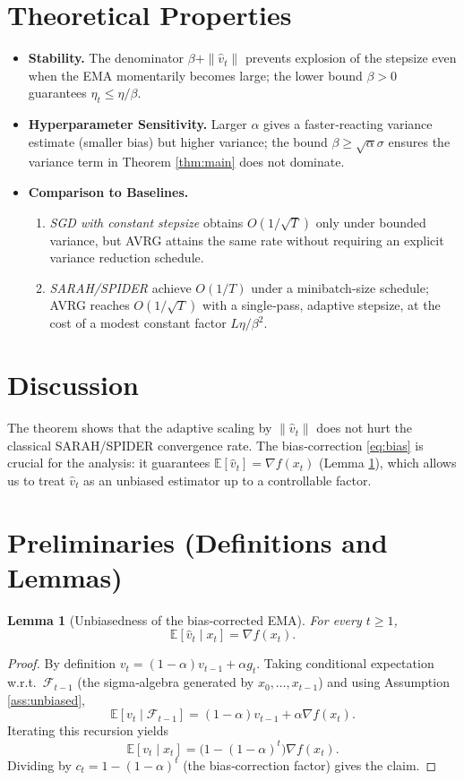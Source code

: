 \documentclass[11pt]{article}
\newtheorem{lemma}{Lemma}
\newcommand{\E}{\mathbb{E}}
\newcommand{\grad}{\nabla}
\begin{document}
\section*{Theoretical Properties}
\begin{itemize}[leftmargin=*]
\item \textbf{Stability.} The denominator $\beta+\|\hat v_{t}\|$ prevents explosion of the stepsize even when the EMA momentarily becomes large; the lower bound $\beta>0$ guarantees $\eta_{t}\le \eta/\beta$.
\item \textbf{Hyperparameter Sensitivity.} Larger $\alpha$ gives a faster‑reacting variance estimate (smaller bias) but higher variance; the bound $\beta\ge\sqrt{\alpha}\sigma$ ensures the variance term in Theorem \ref{thm:main} does not dominate.
\item \textbf{Comparison to Baselines.}
    \begin{enumerate}
        \item \emph{SGD with constant stepsize} obtains $O(1/\sqrt{T})$ only under bounded variance, but AVRG attains the same rate without requiring an explicit variance reduction schedule.
        \item \emph{SARAH/SPIDER} achieve $O(1/T)$ under a minibatch‑size schedule; AVRG reaches $O(1/\sqrt{T})$ with a single‑pass, adaptive stepsize, at the cost of a modest constant factor $L\eta/\beta^{2}$.
    \end{enumerate}
\end{itemize}

\section*{Discussion}
The theorem shows that the adaptive scaling by $\|\hat v_{t}\|$ does not hurt the classical SARAH/SPIDER convergence rate. The bias‑correction \eqref{eq:bias} is crucial for the analysis: it guarantees $\E[\hat v_{t}] = \grad f(x_{t})$ (Lemma \ref{lem:unbiased}), which allows us to treat $\hat v_{t}$ as an unbiased estimator up to a controllable factor.

\newpage
\section*{Preliminaries (Definitions and Lemmas)}
\begin{lemma}[Unbiasedness of the bias‑corrected EMA]\label{lem:unbiased}
For every $t\ge 1$,
\[
\E[\hat v_{t}\mid x_{t}] = \grad f(x_{t}).
\]
\end{lemma}
\begin{proof}
By definition $v_{t}= (1-\alpha)v_{t-1}+ \alpha g_{t}$.
Taking conditional expectation w.r.t.\ $\mathcal{F}_{t-1}$ (the sigma‑algebra generated by $x_{0},\dots,x_{t-1}$) and using Assumption \ref{ass:unbiased},
\[
\E[v_{t}\mid \mathcal{F}_{t-1}]
= (1-\alpha)v_{t-1}+ \alpha \grad f(x_{t}).
\]
Iterating this recursion yields
\[
\E[v_{t}\mid x_{t}]
= \big(1-(1-\alpha)^{t}\big)\grad f(x_{t}).
\]
Dividing by $c_{t}=1-(1-\alpha)^{t}$ (the bias‑correction factor) gives the claim.
\end{proof}
\end{document}
